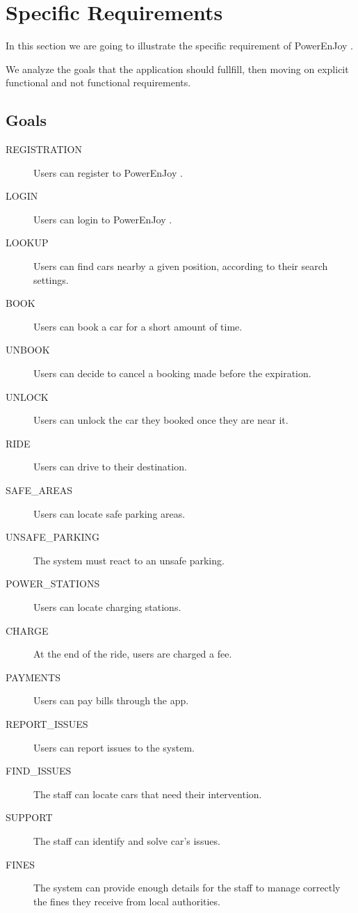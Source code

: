 \documentclass[11pt]{article} %
\newcommand{\pe}{PowerEnJoy }
\begin{document}
\newpage

\section{Specific Requirements}

In this section we are going to illustrate the specific requirement of \pe.

We analyze the goals that the application should fullfill, then moving on explicit functional and not functional requirements.

 \subsection{Goals}

 \begin{description}
 	\item[REGISTRATION] Users can register to \pe.
	\item[LOGIN] Users can login to \pe.
 	\item[LOOKUP] Users can find cars nearby a given position, according to their search settings.
 	\item[BOOK] Users can book a car for a short amount of time.
 	\item[UNBOOK] Users can decide to cancel a booking made before the expiration.
 	\item[UNLOCK] Users can unlock the car they booked once they are near it.
	\item[RIDE] Users can drive to their destination.
	\item[SAFE\_AREAS] Users can locate safe parking areas.
	\item[UNSAFE\_PARKING] The system must react to an unsafe parking.
	\item[POWER\_STATIONS] Users can locate charging stations.
	\item[CHARGE] At the end of the ride, users are charged a fee.
	\item[PAYMENTS] Users can pay bills through the app.
	\item[REPORT\_ISSUES] Users can report issues to the system.
	\item[FIND\_ISSUES] The staff can locate cars that need their intervention.
	\item[SUPPORT] The staff can identify and solve car's issues.
	\item[FINES] The system can provide enough details for the staff to manage correctly the fines they receive from local authorities.
 \end{description}
\end{document}
